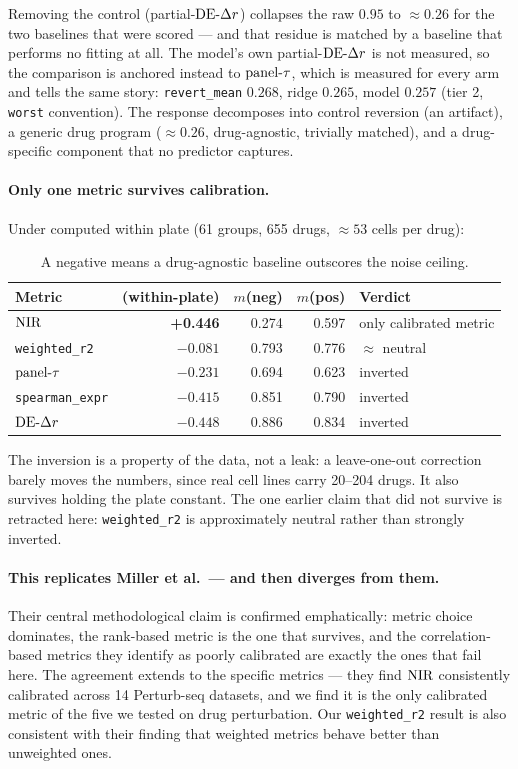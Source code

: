 Removing the control (partial-$\textrm{DE-}\Delta r$) collapses the raw $0.95$ to $\approx 0.26$ for the two
baselines that were scored --- and that residue is matched by a baseline that performs no fitting at
all. The model's own partial-$\textrm{DE-}\Delta r$ is not measured, so the comparison is anchored instead to
$\textrm{panel-}\tau$, which is measured for every arm and tells the same story: \texttt{revert\_mean} $0.268$,
ridge $0.265$, model $0.257$ (tier 2, \texttt{worst} convention). The response decomposes into
control reversion (an artifact), a generic drug program ($\approx 0.26$, drug-agnostic, trivially
matched), and a drug-specific component that no predictor captures.

\paragraph{Only one metric survives calibration.} Under \DRF{} computed within plate (61 groups,
655 drugs, $\approx53$ cells per drug):

\begin{table}[h]
\centering
\begin{tabular}{lrrrl}
\toprule
Metric & \DRF{} (within-plate) & $m$(neg) & $m$(pos) & Verdict \\
\midrule
$\textrm{NIR}$          & \textbf{+0.446} & 0.274 & 0.597 & only calibrated metric \\
\texttt{weighted\_r2} & $-0.081$ & 0.793 & 0.776 & $\approx$ neutral \\
$\textrm{panel-}\tau$     & $-0.231$ & 0.694 & 0.623 & inverted \\
\texttt{spearman\_expr} & $-0.415$ & 0.851 & 0.790 & inverted \\
$\textrm{DE-}\Delta r$         & $-0.448$ & 0.886 & 0.834 & inverted \\
\bottomrule
\end{tabular}
\caption{A negative \DRF{} means a drug-agnostic baseline outscores the noise ceiling.}
\label{tab:drf}
\end{table}

The inversion is a property of the data, not a leak: a leave-one-out correction barely moves the
numbers, since real cell lines carry 20--204 drugs. It also survives holding the plate constant. The
one earlier claim that did not survive is retracted here: \texttt{weighted\_r2} is approximately
neutral rather than strongly inverted.

\paragraph{This replicates Miller et al.\ --- and then diverges from them.} Their central
methodological claim is confirmed emphatically: metric choice dominates, the rank-based metric is
the one that survives, and the correlation-based metrics they identify as poorly calibrated are
exactly the ones that fail here. The agreement extends to the specific metrics --- they find
$\textrm{NIR}$ consistently calibrated across 14 Perturb-seq datasets, and we find it is the only
calibrated metric of the five we tested on drug perturbation. Our \texttt{weighted\_r2} result is
also consistent with their finding that weighted metrics behave better than unweighted ones.

